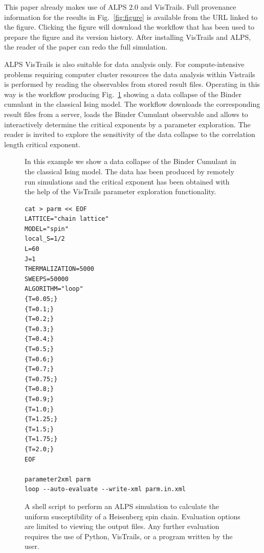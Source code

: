 \documentclass[12pt]{iopart}
\begin{document}
This paper already makes use of ALPS 2.0 and VisTrails. Full provenance information for the results in Fig.~\ref{fig:figure} is available from the URL linked to the figure. Clicking the figure will download the workflow that has been used to prepare the figure and its version history. After installing VisTrails and ALPS, the reader of the paper can redo the full simulation.

ALPS VisTrails is also suitable for data analysis only. For compute-intensive problems requiring computer cluster resources the data analysis within Vistrails is performed by reading the observables from stored result files. Operating in this way is the workflow producing Fig.~\ref{fig:datacollapse} showing a data collapse of the Binder cumulant in the classical Ising model. The workflow downloads the corresponding result files from a server, loads the Binder Cumulant observable and allows to interactively determine the critical exponents by a parameter exploration. The reader is invited to explore the sensitivity of the data collapse to the correlation length critical exponent.

\begin{figure}[t]
\centering
{}
\caption{In this example we show a data collapse of the Binder Cumulant in the classical Ising model. The data has been produced by remotely run simulations and the critical exponent has been obtained with the help of the VisTrails parameter exploration functionality.}
\label{fig:datacollapse}
\end{figure}

\begin{figure}[t]
\begin{multicols}{2}
\begin{lstlisting}
cat > parm << EOF
LATTICE="chain lattice"
MODEL="spin"
local_S=1/2
L=60
J=1
THERMALIZATION=5000
SWEEPS=50000
ALGORITHM="loop"
{T=0.05;}
{T=0.1;}
{T=0.2;}
{T=0.3;}
{T=0.4;}
{T=0.5;}
{T=0.6;}
{T=0.7;}
{T=0.75;}
{T=0.8;}
{T=0.9;}
{T=1.0;}
{T=1.25;}
{T=1.5;}
{T=1.75;}
{T=2.0;}
EOF

parameter2xml parm
loop --auto-evaluate --write-xml parm.in.xml
\end{lstlisting}
\end{multicols}
\caption{A shell script to perform an ALPS simulation to calculate the uniform susceptibility of a Heisenberg spin chain. Evaluation options are limited to viewing the output files. Any further evaluation requires the use of Python, VisTrails, or a program written by the user.}
\label{fig:commandline}
\end{figure}
\end{document}
